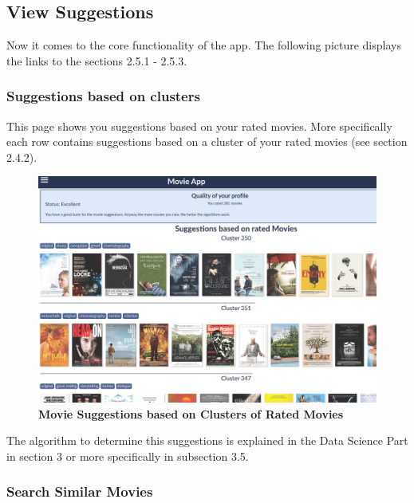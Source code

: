 \documentclass{article}
\begin{document}
\subsection{View Suggestions}

Now it comes to the core functionality of the app. The following picture displays the links to the sections 2.5.1 - 2.5.3.

\subsubsection{Suggestions based on clusters}

This page shows you suggestions based on your rated movies. More specifically each row contains suggestions based on a cluster of your rated movies (see section 2.4.2).
\begin{figure}[t!]
\includegraphics[scale=0.25]{screenshots_app/suggestion_clusters.png}
\caption{\textbf{Movie Suggestions based on Clusters of Rated Movies}}\label{fig_suggestion_clusters}
\end{figure}
The algorithm to determine this suggestions is explained in the Data Science Part in section 3 or more specifically in subsection 3.5.

\subsubsection{Search Similar Movies}
\end{document}
